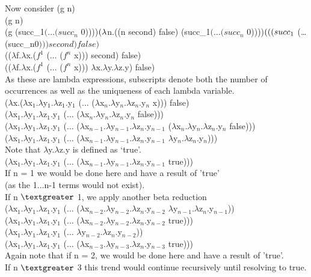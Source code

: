 \documentclass{jhwhw}
\begin{document}
	\bigbreak
	Now consider (g n) \\
	(g n) \\
	(g (succ_1$ (\ldots (succ_n$ 0))))$ \\
	(\lambda $n.((n second) false) (succ_1$ (\ldots (succ_n$ 0))))$ \\
	(((succ_1$ (\ldots (succ_n$ 0))) second) false)$ \\
	(($\lambda$f.$\lambda$x.($f^1$ ($\ldots$ ($f^n$ x))) second) false)\\
	(($\lambda$f.$\lambda$x.($f^1$ ($\ldots$ ($f^n$ x))) $\lambda$x.$\lambda$y.$\lambda$z.y) false)\\
	As these are lambda expressions, subscripts denote both the number of occurrences as well as 
	the uniqueness of each lambda variable. \\
	($\lambda$x.($\lambda$x$_1$.$\lambda$y$_1$.$\lambda$z$_1$.y$_1$ 
		($\ldots$ ($\lambda$x$_n$.$\lambda$y$_n$.$\lambda$z$_n$.y$_n$ x))) false) \\
	($\lambda$x$_1$.$\lambda$y$_1$.$\lambda$z$_1$.y$_1$ 
		($\ldots$ ($\lambda$x$_n$.$\lambda$y$_n$.$\lambda$z$_n$.y$_n$ false))) \\
	($\lambda$x$_1$.$\lambda$y$_1$.$\lambda$z$_1$.y$_1$ ($\ldots$ 
		($\lambda$x$_{n-1}$.$\lambda$y$_{n-1}$.$\lambda$z$_n$.y$_{n-1}$ 
		($\lambda$x$_n$.$\lambda$y$_n$.$\lambda$z$_n$.y$_n$ 
		false))) \\
	($\lambda$x$_1$.$\lambda$y$_1$.$\lambda$z$_1$.y$_1$ ($\ldots$ 
		($\lambda$x$_{n-1}$.$\lambda$y$_{n-1}$.$\lambda$z$_n$.y$_{n-1}$ 
		$\lambda$y$_n$.$\lambda$z$_n$.y$_n$))) \\
	Note that $\lambda$y.$\lambda$z.y is defined as `true'. \\
	($\lambda$x$_1$.$\lambda$y$_1$.$\lambda$z$_1$.y$_1$ ($\ldots$ 
		($\lambda$x$_{n-1}$.$\lambda$y$_{n-1}$.$\lambda$z$_n$.y$_{n-1}$ 
		true))) \\
	If n = 1 we would be done here and have a result of 'true' \\ (as the 1$\ldots$n-1 terms would not exist). \\
	If n $\textgreater$ 1, we apply another beta reduction \\
	($\lambda$x$_1$.$\lambda$y$_1$.$\lambda$z$_1$.y$_1$ ($\ldots$ 
		($\lambda$x$_{n-2}$.$\lambda$y$_{n-2}$.$\lambda$z$_n$.y$_{n-2}$ 
		$\lambda$y$_{n-1}$.$\lambda$z$_n$.y$_{n-1}$)) \\
	($\lambda$x$_1$.$\lambda$y$_1$.$\lambda$z$_1$.y$_1$ ($\ldots$ 
		($\lambda$x$_{n-2}$.$\lambda$y$_{n-2}$.$\lambda$z$_n$.y$_{n-2}$ 
		true))) \\
	($\lambda$x$_1$.$\lambda$y$_1$.$\lambda$z$_1$.y$_1$ ($\ldots$ 
		$\lambda$y$_{n-2}$.$\lambda$z$_n$.y$_{n-2}$)) \\
	($\lambda$x$_1$.$\lambda$y$_1$.$\lambda$z$_1$.y$_1$ ($\ldots$ 
		($\lambda$x$_{n-3}$.$\lambda$y$_{n-3}$.$\lambda$z$_n$.y$_{n-3}$ 
		true))) \\
	Again note that if n = 2, we would be done here and have a result of 'true'. \\
	If n $\textgreater$ 3 this trend would continue recursively until resolving to true. \\
\end{document}
